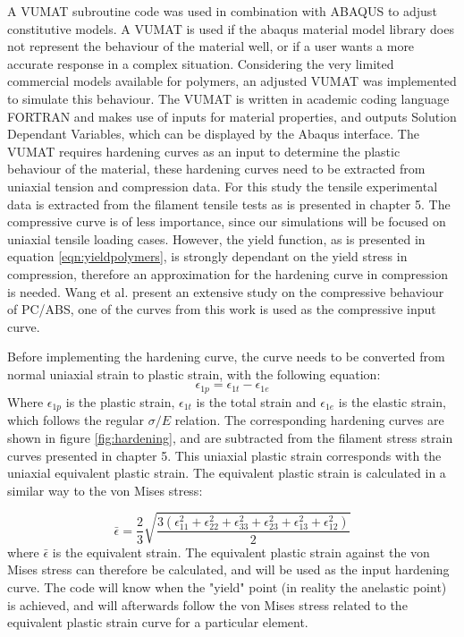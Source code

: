A VUMAT subroutine code was used in combination with ABAQUS to adjust constitutive models. A VUMAT is used if the abaqus material model library does not represent the behaviour of the material well, or if a user wants a more accurate response in a complex situation\cite{SimuliaWritingAbaqus}. Considering the very limited commercial models available for polymers, an adjusted VUMAT was implemented to simulate this behaviour. The VUMAT is written in academic coding language FORTRAN and makes use of inputs for material properties, and outputs Solution Dependant Variables, which can be displayed by the Abaqus interface. The VUMAT requires hardening curves as an input to determine the plastic behaviour of the material, these hardening curves need to be extracted from uniaxial tension and compression data. For this study the tensile experimental data is extracted from the filament tensile tests as is presented in chapter 5. The compressive curve is of less importance, since our simulations will be focused on uniaxial tensile loading cases. However, the yield function, as is presented in equation \ref{eqn:yieldpolymers}, is strongly dependant on the yield stress in compression, therefore an approximation for the hardening curve in compression is needed. Wang et al. \cite{Wang2016ExperimentalRates} present an extensive study on the compressive behaviour of PC/ABS, one of the curves from this work is used as the compressive input curve. 

Before implementing the hardening curve, the curve needs to be converted from normal uniaxial strain to plastic strain, with the following equation:
\begin{equation} \label{eqn:toplastic}
\epsilon_{1p}=\epsilon_{1t}-\epsilon_{1e}
\end{equation}
Where $\epsilon_{1p}$ is the plastic strain, $\epsilon_{1t}$ is the total strain and $\epsilon_{1e}$ is the elastic strain, which follows the regular $\sigma/E$ relation. The corresponding hardening curves are shown in figure \ref{fig:hardening}, and are subtracted from the filament stress strain curves presented in chapter 5. This uniaxial plastic strain corresponds with the uniaxial equivalent plastic strain. The equivalent plastic strain is calculated in a similar way to the von Mises stress:

\begin{equation}\label{fig:eqstrain}
\bar\epsilon=\frac{2}{3}\sqrt{\frac{3(\epsilon_{11}^2+\epsilon_{22}^2+\epsilon_{33}^2+\epsilon_{23}^2+\epsilon_{13}^2+\epsilon_{12}^2)}{2}} 
\end{equation}
where $\bar\epsilon$ is the equivalent strain. The equivalent plastic strain against the von Mises stress can therefore be calculated, and will be used as the input hardening curve. The code will know when the "yield" point (in reality the anelastic point) is achieved, and will afterwards follow the von Mises stress related to the equivalent plastic strain curve for a particular element. 


